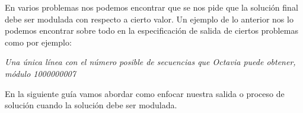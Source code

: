 En varios problemas nos podemos encontrar que se nos pide que la solución final debe ser modulada con respecto a cierto valor. Un ejemplo de lo anterior nos lo podemos encontrar sobre todo en la especificación de salida de ciertos problemas como por ejemplo: 

\emph{Una única línea con el número posible de secuencias que Octavia puede obtener, módulo 1000000007}

En la siguiente guía vamos abordar como enfocar nuestra salida o proceso de solución cuando la solución debe ser modulada. 